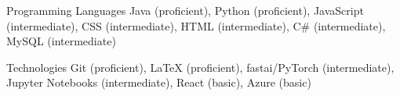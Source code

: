 


\begin{cvskills}


\cvskill
{Programming Languages} %
{Java (proficient), Python (proficient), JavaScript (intermediate), CSS (intermediate), HTML (intermediate), C\# (intermediate), MySQL (intermediate)} %


\cvskill
{Technologies} %
{Git (proficient),  \textrm{\LaTeX} (proficient),
fastai/PyTorch (intermediate), Jupyter Notebooks (intermediate), React (basic), Azure (basic)} %





\end{cvskills}